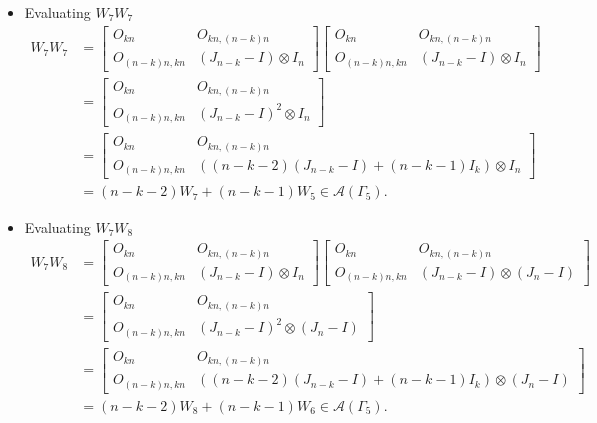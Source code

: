 \begin{itemize}
\item Evaluating $W_{7}W_{7}$
\begin{align*}
    W_7W_7
    &= \begin{bmatrix}
        O_{kn} & O_{kn, (n-k)n} \\
        O_{(n-k)n,kn} & (J_{n - k} - I) \otimes I_n
    \end{bmatrix}
    \begin{bmatrix}
        O_{kn} & O_{kn, (n-k)n} \\
        O_{(n-k)n,kn} & (J_{n - k} - I) \otimes I_n
    \end{bmatrix}\\
    &= \begin{bmatrix}
        O_{kn} & O_{kn, (n-k)n} \\
        O_{(n-k)n,kn} & (J_{n - k} - I)^2 \otimes I_n
    \end{bmatrix}\\
    &= \begin{bmatrix}
        O_{kn} & O_{kn, (n-k)n} \\
        O_{(n-k)n,kn} & ((n-k-2)(J_{n - k} - I) + (n-k-1)I_k) \otimes I_n
    \end{bmatrix}\\
    &= (n-k-2)W_7 + (n-k-1)W_5\in\mathcal{A}(\Gamma_5).
\end{align*}

\item Evaluating $W_{7}W_{8}$
\begin{align*}
    W_7W_8
    &= \begin{bmatrix}
        O_{kn} & O_{kn, (n-k)n} \\
        O_{(n-k)n,kn} & (J_{n - k} - I) \otimes I_n
    \end{bmatrix}
    \begin{bmatrix}
        O_{kn} & O_{kn, (n-k)n} \\
        O_{(n-k)n,kn} & (J_{n - k} - I) \otimes (J_n-I)
    \end{bmatrix}\\
    &= \begin{bmatrix}
        O_{kn} & O_{kn, (n-k)n} \\
        O_{(n-k)n,kn} & (J_{n - k} - I)^2 \otimes (J_n-I)
    \end{bmatrix}\\
    &= \begin{bmatrix}
        O_{kn} & O_{kn, (n-k)n} \\
        O_{(n-k)n,kn} & ((n-k-2)(J_{n - k} - I) + (n-k-1)I_k) \otimes (J_n-I)
    \end{bmatrix}\\
    &= (n-k-2)W_8 + (n-k-1)W_6\in\mathcal{A}(\Gamma_5).
\end{align*}


\end{itemize}
